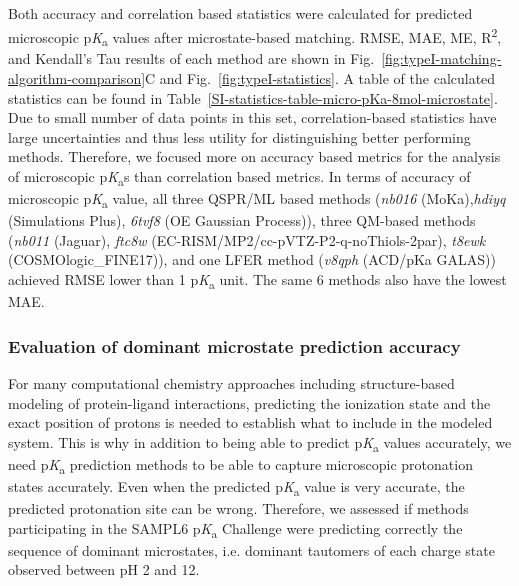 \documentclass[9pt,lineno,final]{elife}
\newcommand{\pKa}{p\textit{K}\textsubscript{a}}
\begin{document}
Both accuracy and correlation based statistics were calculated for predicted microscopic \pKa{} values after microstate-based matching. RMSE, MAE, ME, R\textsuperscript{2}, and Kendall's Tau results of each method are shown in Fig.~\ref{fig:typeI-matching-algorithm-comparison}C and Fig.~\ref{fig:typeI-statistics}. A table of the calculated statistics can be found in Table~\ref{SI-statistics-table-micro-pKa-8mol-microstate}. Due to small number of data points in this set, correlation-based statistics have large uncertainties and thus less utility for distinguishing better performing methods. Therefore, we focused more on accuracy based metrics for the analysis of microscopic \pKa{}s than correlation based metrics. In terms of accuracy of microscopic \pKa{} value, all three QSPR/ML based methods (\textit{nb016} (MoKa),\textit{hdiyq} (Simulations Plus), \textit{6tvf8} (OE Gaussian Process)), three QM-based methods (\textit{nb011} (Jaguar), \textit{ftc8w} (EC-RISM/MP2/cc-pVTZ-P2-q-noThiols-2par), \textit{t8ewk} (COSMOlogic\_FINE17)), and one LFER method (\textit{v8qph} (ACD/pKa GALAS)) achieved RMSE lower than 1 \pKa{} unit. The same 6 methods also have the lowest MAE.


\subsubsection{Evaluation of dominant microstate prediction accuracy}

For many computational chemistry approaches including structure-based modeling of protein-ligand interactions, predicting the ionization state and the exact position of protons is needed to establish what to include in the modeled system.  
This is why in addition to being able to predict \pKa{} values accurately, we need \pKa{} prediction methods to be able to capture microscopic protonation states accurately. Even when the predicted \pKa{} value is very accurate, the predicted protonation site can be wrong. 
Therefore, we assessed if methods participating in the SAMPL6 \pKa{} Challenge were predicting correctly the sequence of dominant microstates, i.e. dominant tautomers of each charge state observed between pH 2 and 12.
\end{document}
